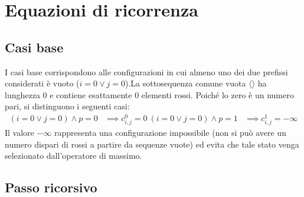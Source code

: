 \section{Equazioni di ricorrenza}

\subsection{Casi base}
I casi base corrispondono alle configurazioni in cui almeno uno dei due prefissi considerati è vuoto ($i = 0 \lor j = 0$).La sottosequenza comune vuota $\langle \rangle$ ha lunghezza $0$ e contiene esattamente $0$ elementi rossi. Poiché lo zero è un numero pari, si distinguono i seguenti casi:
\begin{align*}
(i = 0 \lor j = 0) \land p = 0 &\implies c_{i,j}^0 = 0 \
(i = 0 \lor j = 0) \land p = 1 &\implies c_{i,j}^1 = -\infty
\end{align*}
Il valore $-\infty$ rappresenta una configurazione impossibile (non si può avere un numero dispari di rossi a partire da sequenze vuote) ed evita che tale stato venga selezionato dall'operatore di massimo.\subsection{Passo ricorsivo}
